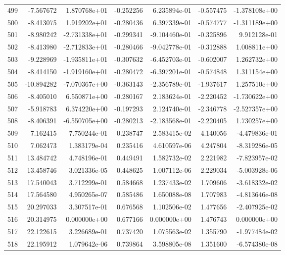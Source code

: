 \begin{tabular}{rrrrrrr}
 499 &  -7.567672 &  1.870768e+01 & -0.252256 &  6.235894e-01 &  -0.557475 & -1.378108e+00 \\
 500 &  -8.413075 &  1.919202e+01 & -0.280436 &  6.397339e-01 &  -0.574777 & -1.311189e+00 \\
 501 &  -8.980242 & -2.731338e+01 & -0.299341 & -9.104460e-01 &  -0.325896 &  9.912128e-01 \\
 502 &  -8.413980 & -2.712833e+01 & -0.280466 & -9.042778e-01 &  -0.312888 &  1.008811e+00 \\
 503 &  -9.228969 & -1.935811e+01 & -0.307632 & -6.452703e-01 &  -0.602007 &  1.262732e+00 \\
 504 &  -8.414150 & -1.919160e+01 & -0.280472 & -6.397201e-01 &  -0.574848 &  1.311154e+00 \\
 505 & -10.894282 & -7.070367e+00 & -0.363143 & -2.356789e-01 &  -1.937617 &  1.257510e+00 \\
 506 &  -8.405010 &  6.550871e+00 & -0.280167 &  2.183624e-01 &  -2.220452 & -1.730622e+00 \\
 507 &  -5.918783 &  6.374220e+00 & -0.197293 &  2.124740e-01 &  -2.346778 & -2.527357e+00 \\
 508 &  -8.406391 & -6.550705e+00 & -0.280213 & -2.183568e-01 &  -2.220405 &  1.730257e+00 \\
 509 &   7.162415 &  7.750244e-01 &  0.238747 &  2.583415e-02 &   4.140056 & -4.479836e-01 \\
 510 &   7.062473 &  1.383179e-04 &  0.235416 &  4.610597e-06 &   4.247804 & -8.319286e-05 \\
 511 &  13.484742 &  4.748196e-01 &  0.449491 &  1.582732e-02 &   2.221982 & -7.823957e-02 \\
 512 &  13.458746 &  3.021336e-05 &  0.448625 &  1.007112e-06 &   2.229034 & -5.003928e-06 \\
 513 &  17.540043 &  3.712299e-01 &  0.584668 &  1.237433e-02 &   1.709606 & -3.618332e-02 \\
 514 &  17.564580 &  4.950265e-07 &  0.585486 &  1.650088e-08 &   1.707983 & -4.813646e-08 \\
 515 &  20.297033 &  3.307517e-01 &  0.676568 &  1.102506e-02 &   1.477656 & -2.407925e-02 \\
 516 &  20.314975 &  0.000000e+00 &  0.677166 &  0.000000e+00 &   1.476743 &  0.000000e+00 \\
 517 &  22.122615 &  3.226689e-01 &  0.737420 &  1.075563e-02 &   1.355790 & -1.977484e-02 \\
 518 &  22.195912 &  1.079642e-06 &  0.739864 &  3.598805e-08 &   1.351600 & -6.574380e-08 \\

\end{tabular}
